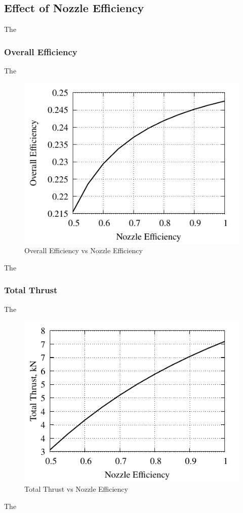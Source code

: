 \documentclass[conf]{new-aiaa} %
\begin{document}
\subsection{Effect of Nozzle Efficiency} %
The

\subsubsection{Overall Efficiency}
The

\begin{figure}[H] %
    \centering
    \includegraphics[]{media/performance_parameter_files/part_g_eta_o.pdf}
    \caption{\label{fig:partgetao}Overall Efficiency vs Nozzle Efficiency}
\end{figure}
The

\subsubsection{Total Thrust}
The

\begin{figure}[H] %
    \centering
    \includegraphics[]{media/performance_parameter_files/part_g_T.pdf}
    \caption{\label{fig:partgt}Total Thrust vs Nozzle Efficiency}
\end{figure}
The
\end{document}
